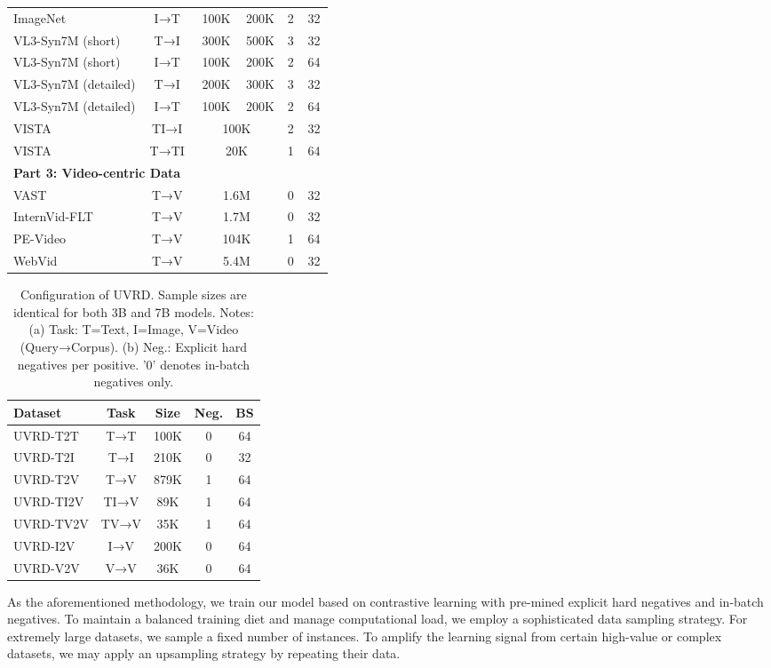 \begin{table}[t]
\begin{tabular}{@{}p{0.42\linewidth}crrcc@{}}
ImageNet & I→T & 100K & 200K & 2 & 32 \\
VL3-Syn7M (short) & T→I & 300K & 500K & 3 & 32 \\
VL3-Syn7M (short) & I→T & 100K & 200K & 2 & 64 \\
VL3-Syn7M (detailed) & T→I & 200K & 300K & 3 & 32 \\
VL3-Syn7M (detailed) & I→T & 100K & 200K & 2 & 64 \\
VISTA & TI→I & \multicolumn{2}{c}{100K} & 2 & 32 \\
VISTA & T→TI & \multicolumn{2}{c}{20K} & 1 & 64 \\
\midrule
\multicolumn{6}{l}{\textbf{Part 3: Video-centric Data}} \\
VAST & T→V & \multicolumn{2}{c}{1.6M} & 0 & 32 \\
InternVid-FLT & T→V & \multicolumn{2}{c}{1.7M} & 0 & 32 \\
PE-Video & T→V & \multicolumn{2}{c}{104K} & 1 & 64 \\
WebVid & T→V & \multicolumn{2}{c}{5.4M} & 0 & 32 \\
\bottomrule
\end{tabular}
\end{table}

\begin{table}[t]
\centering
\caption{Configuration of UVRD. Sample sizes are identical for both 3B and 7B models. Notes: (a) Task: T=Text, I=Image, V=Video (Query→Corpus). (b) Neg.: Explicit hard negatives per positive. '0' denotes in-batch negatives only.}
\label{gve:tab:uvrd_data}
\begin{tabular}{l c c c c}
\toprule
\textbf{Dataset} & \textbf{Task} & \textbf{Size} & \textbf{Neg.} & \textbf{BS} \\
\midrule
UVRD-T2T & T→T & 100K & 0 & 64 \\
UVRD-T2I & T→I & 210K & 0 & 32 \\
UVRD-T2V & T→V & 879K & 1 & 64 \\
UVRD-TI2V & TI→V & 89K & 1 & 64 \\
UVRD-TV2V & TV→V & 35K & 1 & 64 \\
UVRD-I2V & I→V & 200K & 0 & 64 \\
UVRD-V2V & V→V & 36K & 0 & 64 \\
\bottomrule
\end{tabular}
\end{table}

As the aforementioned methodology, we train our model based on contrastive learning with pre-mined explicit hard negatives and in-batch negatives.
To maintain a balanced training diet and manage computational load, we employ a sophisticated data sampling strategy. For extremely large datasets, we sample a fixed number of instances. To amplify the learning signal from certain high-value or complex datasets, we may apply an upsampling strategy by repeating their data.

